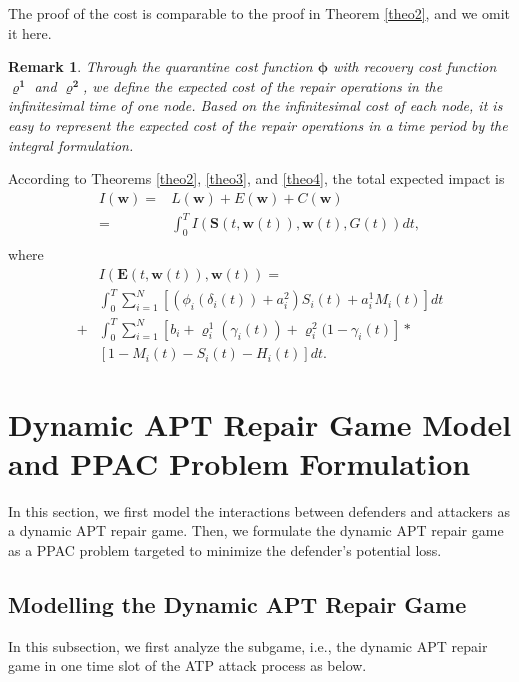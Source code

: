 \documentclass[lettersize,journal]{IEEEtran}
\newtheorem{remark}{ \textbf{Remark}}
\begin{document}
\begin{IEEEproof}
The proof of the cost is comparable to the proof in Theorem \ref{theo2}, and we omit it here.
\end{IEEEproof}
\begin{remark}
Through the quarantine cost function $\bm{\phi}$ with recovery cost function $\bm{\varrho^1}$ and $\bm{\varrho^2}$, we define the expected cost of the repair operations in the infinitesimal time of one node. Based on the infinitesimal cost of each node, it is easy to represent the expected cost of the repair operations in a time period by the integral formulation.
\end{remark}
\par
   According to Theorems \ref{theo2}, \ref{theo3}, and \ref{theo4}, the total expected impact is
\begin{equation}\label{eq_totalimpact}
\begin{aligned}
I(\bm{w}) = &L(\bm{w})+E(\bm{w})+C(\bm{w}) \\
=&\int_0^TI(\bm{S}(t,\bm{w}(t)),\bm{w}(t),G(t))dt,\\
   \end{aligned}
\end{equation}
where 
\begin{equation}\label{eq_total impact}
\begin{aligned}
&I(\bm{E}(t,\bm{w}(t)),\bm{w}(t))=\\ &\int_0^T\sum_{i=1}^N[(\phi_i(\delta_i(t))+a^2_i)S_i(t)+a^1_iM_i(t)]dt\\
+&\int_0^T\sum_{i=1}^N [b_i+\varrho^1_i(\gamma_i(t))+\varrho^2_i(1-\gamma_i(t)]*\\
&[1-M_i(t)-S_i(t)-H_i(t)]dt.
   \end{aligned}
\end{equation}


\section{Dynamic APT Repair Game Model and PPAC Problem Formulation}\label{PPAC formulation}
 
In this section, we first model the interactions between defenders and attackers as a dynamic APT repair game. Then, we formulate the dynamic APT repair game as a PPAC problem targeted to minimize the defender's potential loss.
\subsection{Modelling the Dynamic APT Repair Game}
In this subsection, we first analyze the subgame, i.e., the dynamic APT repair game in one time slot of the ATP attack process as below.
\end{document}
